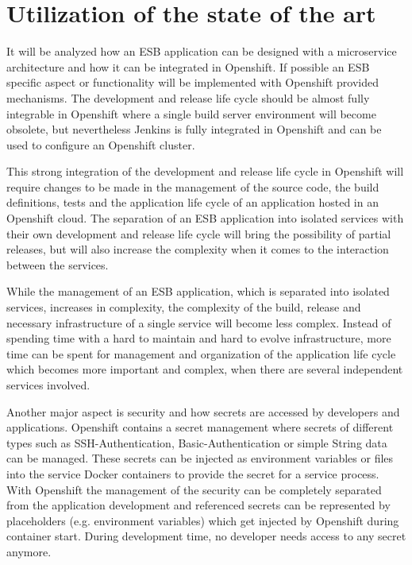 \section{Utilization of the state of the art}
\label{sec:deduction}
It will be analyzed how an ESB application can be designed with a microservice architecture and how it can be integrated in Openshift. If possible an ESB specific aspect or functionality will be implemented with Openshift provided mechanisms. The development and release life cycle should be almost fully integrable in Openshift where a single build server environment will become obsolete, but nevertheless Jenkins is fully integrated in Openshift and can be used to configure an Openshift cluster.

This strong integration of the development and release life cycle in Openshift will require changes to be made in the management of the source code, the build definitions, tests and the application life cycle of an application hosted in an Openshift cloud. The separation of an ESB application into isolated services with their own development and release life cycle will bring the possibility of partial releases, but will also increase the complexity when it comes to the interaction between the services.

While the management of an ESB application, which is separated into isolated services, increases in complexity, the complexity of the build, release and necessary infrastructure  of a single service will become less complex. Instead of spending time with a hard to maintain and hard to evolve infrastructure, more time can be spent for management and organization of the application life cycle which becomes more important and complex, when there are several independent services involved.

Another major aspect is security and how secrets are accessed by developers and applications. Openshift contains a secret management where secrets of different types such as SSH-Authentication, Basic-Authentication or simple String data can be managed. These secrets can be injected as environment variables or files into the service Docker containers to provide the secret for a service process. With Openshift the management of the security can be completely separated from the application development and referenced secrets can be represented by placeholders (e.g. environment variables) which get injected by Openshift during container start. During development time, no developer needs access to any secret anymore.